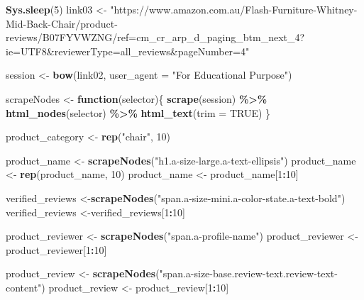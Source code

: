 \documentclass[
]{article}
\newenvironment{Shaded}{\begin{snugshade}}{\end{snugshade}}
\newcommand{\AttributeTok}[1]{\textcolor[rgb]{0.13,0.29,0.53}{#1}}
\newcommand{\ConstantTok}[1]{\textcolor[rgb]{0.56,0.35,0.01}{#1}}
\newcommand{\ControlFlowTok}[1]{\textcolor[rgb]{0.13,0.29,0.53}{\textbf{#1}}}
\newcommand{\DecValTok}[1]{\textcolor[rgb]{0.00,0.00,0.81}{#1}}
\newcommand{\FunctionTok}[1]{\textcolor[rgb]{0.13,0.29,0.53}{\textbf{#1}}}
\newcommand{\NormalTok}[1]{#1}
\newcommand{\OtherTok}[1]{\textcolor[rgb]{0.56,0.35,0.01}{#1}}
\newcommand{\SpecialCharTok}[1]{\textcolor[rgb]{0.81,0.36,0.00}{\textbf{#1}}}
\newcommand{\StringTok}[1]{\textcolor[rgb]{0.31,0.60,0.02}{#1}}
\begin{document}
\begin{Shaded}
\begin{Highlighting}[]
  \FunctionTok{Sys.sleep}\NormalTok{(}\DecValTok{5}\NormalTok{)}
\NormalTok{link03 }\OtherTok{\textless{}{-}} \StringTok{"https://www.amazon.com.au/Flash{-}Furniture{-}Whitney{-}Mid{-}Back{-}Chair/product{-}reviews/B07FYVWZNG/ref=cm\_cr\_arp\_d\_paging\_btm\_next\_4?ie=UTF8\&reviewerType=all\_reviews\&pageNumber=4"}


\NormalTok{  session }\OtherTok{\textless{}{-}} \FunctionTok{bow}\NormalTok{(link02,}
               \AttributeTok{user\_agent =} \StringTok{"For Educational Purpose"}\NormalTok{)}

\NormalTok{  scrapeNodes }\OtherTok{\textless{}{-}} \ControlFlowTok{function}\NormalTok{(selector)\{}
    \FunctionTok{scrape}\NormalTok{(session) }\SpecialCharTok{\%\textgreater{}\%}
      \FunctionTok{html\_nodes}\NormalTok{(selector) }\SpecialCharTok{\%\textgreater{}\%}
      \FunctionTok{html\_text}\NormalTok{(}\AttributeTok{trim =} \ConstantTok{TRUE}\NormalTok{)}
\NormalTok{  \}}

\NormalTok{  product\_category }\OtherTok{\textless{}{-}} \FunctionTok{rep}\NormalTok{(}\StringTok{"chair"}\NormalTok{, }\DecValTok{10}\NormalTok{)}

\NormalTok{  product\_name }\OtherTok{\textless{}{-}} \FunctionTok{scrapeNodes}\NormalTok{(}\StringTok{"h1.a{-}size{-}large.a{-}text{-}ellipsis"}\NormalTok{)}
\NormalTok{  product\_name }\OtherTok{\textless{}{-}} \FunctionTok{rep}\NormalTok{(product\_name, }\DecValTok{10}\NormalTok{)}
\NormalTok{  product\_name }\OtherTok{\textless{}{-}}\NormalTok{ product\_name[}\DecValTok{1}\SpecialCharTok{:}\DecValTok{10}\NormalTok{]}
  
\NormalTok{  verified\_reviews }\OtherTok{\textless{}{-}}\FunctionTok{scrapeNodes}\NormalTok{(}\StringTok{"span.a{-}size{-}mini.a{-}color{-}state.a{-}text{-}bold"}\NormalTok{)}
\NormalTok{  verified\_reviews }\OtherTok{\textless{}{-}}\NormalTok{verified\_reviews[}\DecValTok{1}\SpecialCharTok{:}\DecValTok{10}\NormalTok{]}
  
\NormalTok{  product\_reviewer }\OtherTok{\textless{}{-}} \FunctionTok{scrapeNodes}\NormalTok{(}\StringTok{"span.a{-}profile{-}name"}\NormalTok{)}
\NormalTok{  product\_reviewer }\OtherTok{\textless{}{-}}\NormalTok{ product\_reviewer[}\DecValTok{1}\SpecialCharTok{:}\DecValTok{10}\NormalTok{]}
  
\NormalTok{  product\_review }\OtherTok{\textless{}{-}} \FunctionTok{scrapeNodes}\NormalTok{(}\StringTok{"span.a{-}size{-}base.review{-}text.review{-}text{-}content"}\NormalTok{)}
\NormalTok{  product\_review }\OtherTok{\textless{}{-}}\NormalTok{ product\_review[}\DecValTok{1}\SpecialCharTok{:}\DecValTok{10}\NormalTok{]}
  

\end{Highlighting}
\end{Shaded}
\end{document}

